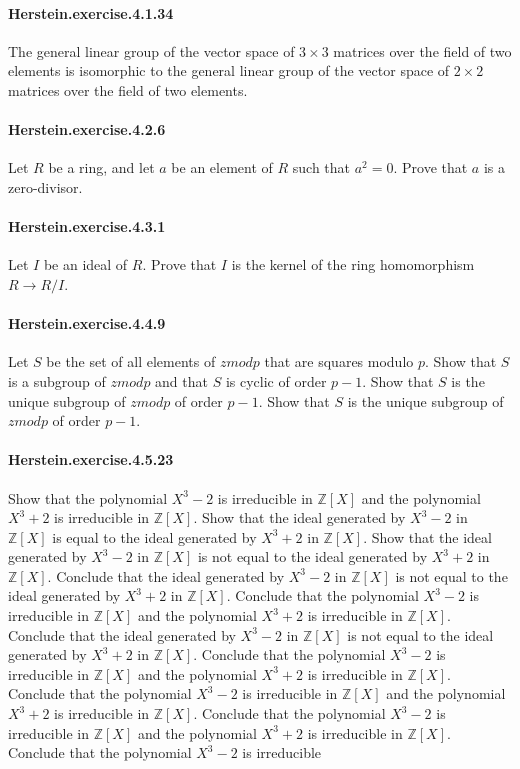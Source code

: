 \documentclass{article}
\begin{document}
\paragraph{Herstein.exercise.4.1.34} The general linear group of the vector space of $3 \times 3$ matrices over the field of two elements is isomorphic to the general linear group of the vector space of $2 \times 2$ matrices over the field of two elements.

\paragraph{Herstein.exercise.4.2.6} Let $R$ be a ring, and let $a$ be an element of $R$ such that $a^2 = 0$. Prove that $a$ is a zero-divisor.

\paragraph{Herstein.exercise.4.3.1} Let $I$ be an ideal of $R$. Prove that $I$ is the kernel of the ring homomorphism $R → R/I$.

\paragraph{Herstein.exercise.4.4.9} Let $S$ be the set of all elements of $zmod p$ that are squares modulo $p$. Show that $S$ is a subgroup of $zmod p$ and that $S$ is cyclic of order $p-1$. Show that $S$ is the unique subgroup of $zmod p$ of order $p-1$. Show that $S$ is the unique subgroup of $zmod p$ of order $p-1$.

\paragraph{Herstein.exercise.4.5.23} Show that the polynomial $X^3 - 2$ is irreducible in $\mathbb{Z}[X]$ and the polynomial $X^3 + 2$ is irreducible in $\mathbb{Z}[X]$. Show that the ideal generated by $X^3 - 2$ in $\mathbb{Z}[X]$ is equal to the ideal generated by $X^3 + 2$ in $\mathbb{Z}[X]$. Show that the ideal generated by $X^3 - 2$ in $\mathbb{Z}[X]$ is not equal to the ideal generated by $X^3 + 2$ in $\mathbb{Z}[X]$. Conclude that the ideal generated by $X^3 - 2$ in $\mathbb{Z}[X]$ is not equal to the ideal generated by $X^3 + 2$ in $\mathbb{Z}[X]$. Conclude that the polynomial $X^3 - 2$ is irreducible in $\mathbb{Z}[X]$ and the polynomial $X^3 + 2$ is irreducible in $\mathbb{Z}[X]$. Conclude that the ideal generated by $X^3 - 2$ in $\mathbb{Z}[X]$ is not equal to the ideal generated by $X^3 + 2$ in $\mathbb{Z}[X]$. Conclude that the polynomial $X^3 - 2$ is irreducible in $\mathbb{Z}[X]$ and the polynomial $X^3 + 2$ is irreducible in $\mathbb{Z}[X]$. Conclude that the polynomial $X^3 - 2$ is irreducible in $\mathbb{Z}[X]$ and the polynomial $X^3 + 2$ is irreducible in $\mathbb{Z}[X]$. Conclude that the polynomial $X^3 - 2$ is irreducible in $\mathbb{Z}[X]$ and the polynomial $X^3 + 2$ is irreducible in $\mathbb{Z}[X]$. Conclude that the polynomial $X^3 - 2$ is irreducible
\end{document}
